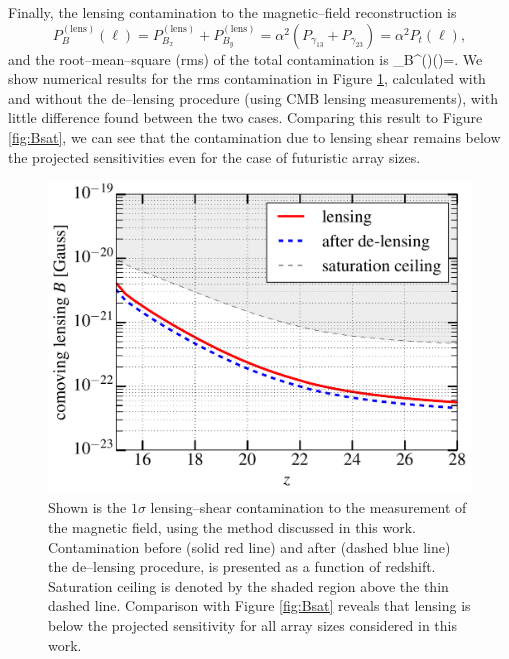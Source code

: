 Finally, the lensing contamination to the magnetic--field reconstruction is
\begin{equation}
P_B^{(\text{lens})}(\ell)=P^{(\text{lens})}_{B_x}+P^{(\text{lens})}_{B_y}=\alpha^2 (P_{\gamma_{13}}+P_{\gamma_{23}})=\alpha^2 P_t(\ell),
\end{equation}
and the root--mean--square (rms) of the total contamination is
\beq
\Delta_B^{()}(\ell)=.
\eeq
We show numerical results for the rms contamination in Figure \ref{fig:lensing_B}, calculated with and without the de--lensing procedure (using CMB lensing measurements), with little difference found between the two cases. Comparing this result to Figure \ref{fig:Bsat}, we can see that the contamination due to lensing shear remains below the projected sensitivities even for the case of futuristic array sizes.
\begin{figure}[h]
\centering
\includegraphics[scale=0.4]{delensingB.pdf}
\caption{Shown is the $1\sigma$ lensing--shear contamination to the measurement of the magnetic field, using the method discussed in this work. Contamination before (solid red line) and after (dashed blue line) the de--lensing procedure, is presented as a function of redshift. Saturation ceiling is denoted by the shaded region above the thin dashed line. Comparison with Figure \ref{fig:Bsat} reveals that lensing is below the projected sensitivity for all array sizes considered in this work.}
\label{fig:lensing_B}
\end{figure}

